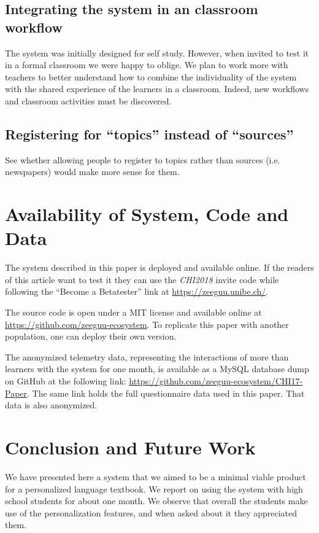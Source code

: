 \subsection{Integrating the system in an classroom workflow}
The system was initially designed for self study. However, when invited to test it in a formal classroom we were happy to oblige. We plan to work more with teachers to better understand how to combine the individuality of the system with the shared experience of the learners in a classroom. Indeed, new workflows and classroom activities must be discovered.

\subsection{Registering for ``topics'' instead of ``sources''}
See whether allowing people to register to topics rather than sources (i.e. newspapers) would make more sense for them. 



\section{Availability of System, Code and Data}

The system described in this paper is deployed and available online. If the readers of this article want to test it they can use the {\em CHI2018} invite code while following the  ``Become a Betatester'' link at \url{https://zeeguu.unibe.ch/}.

The source code is open under a MIT license and available online at \url{https://github.com/zeeguu-ecosystem}. To replicate this paper with another population, one can deploy their own version.

The anonymized telemetry data, representing the interactions of more than \students learners with the system for one month, is available as a MySQL database dump on GitHub at the following link: \url{https://github.com/zeeguu-ecosystem/CHI17-Paper}. The same link holds the full questionnaire data used in this paper. That data is also anonymized. 

\section{Conclusion and Future Work}
We have presented here a system that we aimed to be a minimal viable product for a personalized language textbook. We report on using the system with high school students for about one month. We observe that overall the students make use of the personalization features, and when asked about it they appreciated them. 

